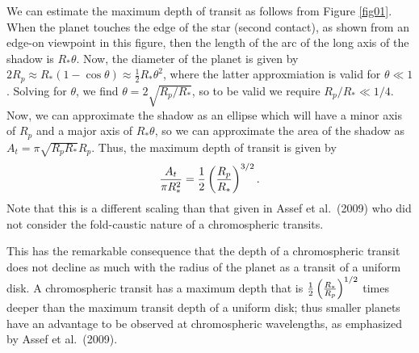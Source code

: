 \documentclass[manuscript]{aastex}
\begin{document}
We can estimate the maximum depth of transit as follows from
Figure \ref{fig01}.  When the planet touches the edge of the star 
(second contact), as shown from an edge-on viewpoint in this figure,
then the length of the arc of the long axis of the shadow is
$R_*\theta$.  Now, the diameter of the planet is given by 
$2 R_p \approx R_*(1-\cos{\theta}) \approx \frac{1}{2} R_* \theta^2$,
where the latter approxmiation is valid for $\theta \ll 1$.
Solving for $\theta$, we find $\theta = 2\sqrt{R_p/R_*}$, so to
be valid we require $R_p/R_* \ll 1/4$.  Now, we can approximate
the shadow as an ellipse which will have a minor axis of $R_p$
and a major axis of $R_*\theta$, so we can approximate the
area of the shadow as $A_t = \pi \sqrt{R_pR_*} R_p$.  Thus,
the maximum depth of transit is given by 
\begin{equation} \label{depth_anal}
{A_t \over \pi R_*^2} = \frac{1}{2} \left({R_p \over R_*}\right)^{3/2}.
\end{equation}
Note that this is a different scaling than that given in Assef et 
al.\ (2009) who did not consider the fold-caustic nature of a chromospheric
transits.

This has the remarkable consequence that the depth of a chromospheric
transit does not decline as much with the radius of the planet as 
a transit of a uniform disk.  A chromospheric transit has a maximum
depth that is $\frac{1}{2} \left({R_* \over R_p}\right)^{1/2}$
times deeper than the maximum transit depth of a uniform disk;
thus smaller planets have an advantage to be observed at
chromospheric wavelengths, as emphasized by Assef et al.\ (2009).
\end{document}
